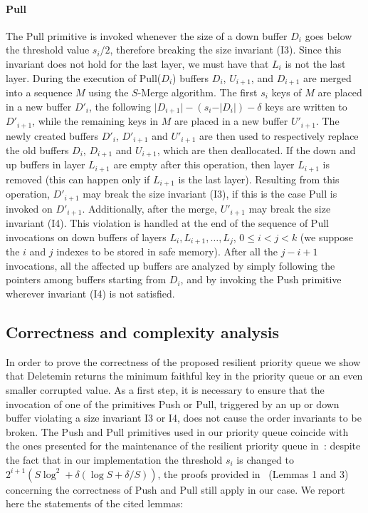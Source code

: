 \documentclass[review,number]{elsarticle}
\newcommand{\SMerge}{$S$-\textsf{Merge}}
\newcommand{\Deletemin}{\textsf{Deletemin}}
\newcommand{\Push}{\textsf{Push}}
\newcommand{\Pull}{\textsf{Pull}}
\begin{document}
\paragraph{\Pull{}} The \Pull{} primitive is invoked whenever the size of a down
buffer $D_{i}$ goes below the threshold value $s_{i}/2$, therefore breaking the
size invariant (I3). Since this invariant does not hold for the last layer, we
must have that $L_i$ is not the last layer. During the execution of
\Pull{}($D_{i}$) buffers $D_{i}$, $U_{i+1}$, and $D_{i+1}$ are merged into a
sequence $M$ using the \SMerge{} algorithm. The first $s_{i}$ keys of $M$ are
placed in a new buffer $D'_{i}$, the following $\vert D_{i+1} \vert -
\left(s_{i} - \vert D_{i}\vert \right)-\delta$ keys are written to $D'_{i+1}$,
while the remaining keys in $M$ are placed in a new buffer $U'_{i+1}$. The newly
created buffers $D'_{i}$, $D'_{i+1}$ and $U'_{i+1}$ are then used to
respectively replace the old buffers $D_{i}$, $D_{i+1}$ and $U_{i+1}$, which are
then deallocated. If the down and up buffers in layer $L_{i+1}$ are empty after
this operation, then layer  $L_{i+1}$ is removed (this can happen only if
$L_{i+1}$ is the last layer). Resulting from this operation, $D'_{i+1}$ may
break the size invariant (I3), if this is the case \Pull{} is invoked on
$D'_{i+1}$. Additionally, after the merge, $U′_{i+1}$ may break the size
invariant (I4). 
This violation is handled at the end of the
sequence of \Pull{} invocations on down buffers of layers
$L_{i},L_{i+1},\ldots,L_{j}$, $0
\leq i < j < k$ (we suppose the $i$ and $j$ indexes to be stored in safe
memory).  After all the $j-i+1$ invocations, all the affected up buffers are
analyzed by
simply following the pointers among buffers starting from $D_{i}$, and by
invoking the \Push{} primitive wherever invariant (I4) is not
satisfied.

\subsection{Correctness and complexity analysis}\label{sec:corr}
In order to prove the correctness of the proposed resilient priority queue we
show that \Deletemin{} returns the minimum faithful key in the priority queue or
an even smaller corrupted value. As a first step, it is necessary to ensure that
the invocation of one of the primitives \Push{} or \Pull{}, triggered by an up
or down buffer violating a size invariant I3 or I4, does not cause the order
invariants to be broken. The \Push{} and \Pull{} primitives used in our priority
queue coincide with the ones presented for the maintenance of the resilient
priority queue in~\cite{JMM07}: despite the fact that in our
implementation the threshold $s_{i}$ is changed to $2^{i+1}\left( S\log^{2}+
\delta \left( \log S + \delta / S \right) \right)$, the proofs provided
in~\cite{JMM07} (Lemmas 1 and 3) concerning the correctness of \Push{} and
\Pull{} still apply in our case. We report here the statements of the cited
lemmas: 
\end{document}
